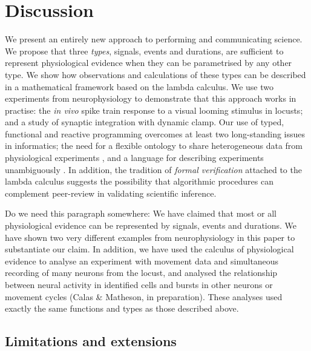 \section*{Discussion}

We present an entirely new approach to performing and communicating
science. We propose that three \emph{types}, signals, events and
durations, are sufficient to represent physiological evidence when
they can be parametrised by any other type. We show how observations
and calculations of these types can be described in a mathematical
framework based on the lambda calculus. We use two experiments from
neurophysiology to demonstrate that this approach works in practise:
the \emph{in vivo} spike train response to a visual looming stimulus
in locusts; and a study of synaptic integration with dynamic
clamp. Our use of typed, functional and reactive programming overcomes
at least two long-standing issues in informatics; the need for a
flexible ontology to share heterogeneous data from physiological
experiments \citep{Amari2002}, and a language for describing
experiments unambiguously \citep{Murray-Rust2002}. In addition, the
tradition of \emph{formal verification} attached to the lambda
calculus suggests the possibility that algorithmic procedures can
complement peer-review in validating scientific inference.

Do we need this paragraph somewhere: We have claimed that most or all
physiological evidence can be represented by signals, events and
durations. We have shown two very different examples from
neurophysiology in this paper to substantiate our claim. In addition,
we have used the calculus of physiological evidence to analyse an
experiment with movement data and simultaneous recording of many
neurons from the locust, and analysed the relationship between neural
activity in identified cells and bursts in other neurons or movement
cycles (Calas \& Matheson, in preparation). These analyses used
exactly the same functions and types as those described above.

\subsection*{Limitations and extensions}

